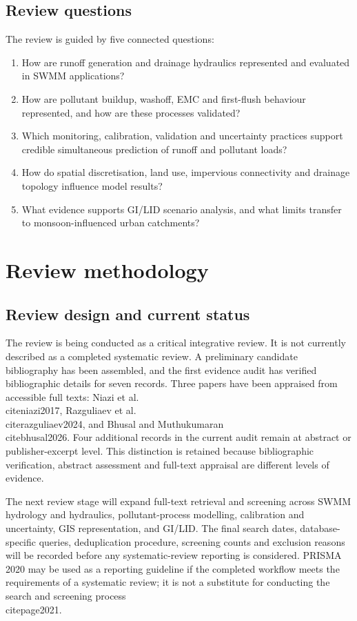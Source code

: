 \documentclass[journal]{IEEEtran}
\begin{document}
\subsection{Review questions}
The review is guided by five connected questions:
\begin{enumerate}[leftmargin=1.5em]
  \item How are runoff generation and drainage hydraulics represented and evaluated in SWMM applications?
  \item How are pollutant buildup, washoff, EMC and first-flush behaviour represented, and how are these processes validated?
  \item Which monitoring, calibration, validation and uncertainty practices support credible simultaneous prediction of runoff and pollutant loads?
  \item How do spatial discretisation, land use, impervious connectivity and drainage topology influence model results?
  \item What evidence supports GI/LID scenario analysis, and what limits transfer to monsoon-influenced urban catchments?
\end{enumerate}

\section{Review methodology}
\subsection{Review design and current status}
The review is being conducted as a critical integrative review. It is not currently described as a completed systematic review. A preliminary candidate bibliography has been assembled, and the first evidence audit has verified bibliographic details for seven records. Three papers have been appraised from accessible full texts: Niazi et al. \\cite{niazi2017}, Razguliaev et al. \\cite{razguliaev2024}, and Bhusal and Muthukumaran \\cite{bhusal2026}. Four additional records in the current audit remain at abstract or publisher-excerpt level. This distinction is retained because bibliographic verification, abstract assessment and full-text appraisal are different levels of evidence.

The next review stage will expand full-text retrieval and screening across SWMM hydrology and hydraulics, pollutant-process modelling, calibration and uncertainty, GIS representation, and GI/LID. The final search dates, database-specific queries, deduplication procedure, screening counts and exclusion reasons will be recorded before any systematic-review reporting is considered. PRISMA 2020 may be used as a reporting guideline if the completed workflow meets the requirements of a systematic review; it is not a substitute for conducting the search and screening process \\cite{page2021}.
\end{document}
